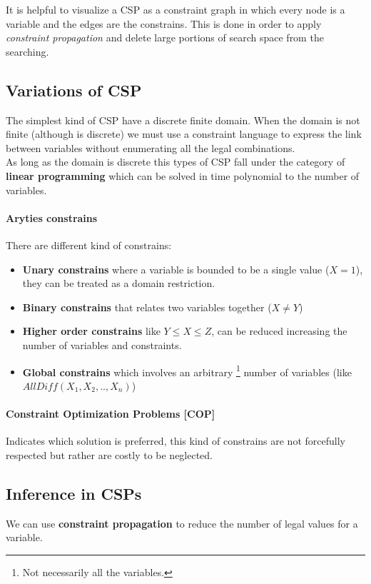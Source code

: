 \documentclass[10pt,a4paper]{article}
\begin{document}
It is helpful to visualize a CSP as a constraint graph in which every node is a variable and the edges are the constrains. This is done in order to apply \textit{constraint propagation} and delete large portions of search space from the searching.

\subsection{Variations of CSP}
The simplest kind of CSP have a discrete finite domain. When the domain is not finite (although is discrete) we must use a constraint language to express the link between variables without enumerating all the legal combinations. \\
As long as the domain is discrete this types of CSP fall under the category of \textbf{linear programming} which can be solved in time polynomial to the number of variables.

\paragraph{Aryties constrains}
There are different kind of constrains:
\begin{itemize}
\item \textbf{Unary constrains} where a variable is bounded to be a single value ($X=1$), they can be treated as a domain restriction.
\item \textbf{Binary constrains} that relates two variables together ($X\neq Y$)
\item \textbf{Higher order constrains} like $Y\le X \le Z$, can be reduced increasing the number of variables and constraints.
\item \textbf{Global constrains} which involves an arbitrary \footnote{Not necessarily all the variables.} number of variables (like $AllDiff(X_1,X_2,..,X_n)$)
\end{itemize}

\paragraph{Constraint Optimization Problems [COP]}
Indicates which solution is preferred, this kind of constrains are not forcefully respected but rather are costly to be neglected.



\subsection{Inference in CSPs}
We can use \textbf{constraint propagation} to reduce the number of legal values for a variable.
\end{document}
